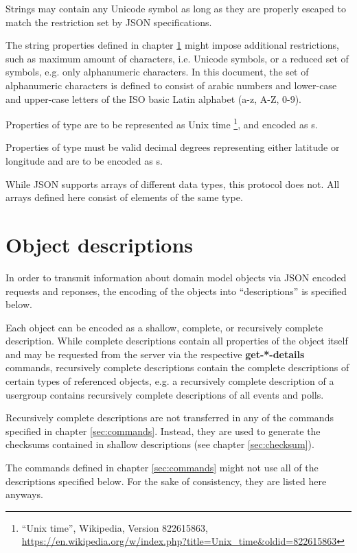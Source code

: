 \documentclass[parskip=full,11pt]{scrartcl}
\begin{document}
Strings may contain any Unicode symbol as long as they are properly escaped to
match the restriction set by JSON specifications.

The string properties defined in chapter \ref{sec:descriptions} might impose
additional restrictions, such as maximum amount of characters, i.e. Unicode
symbols, or a reduced set of symbols, e.g. only alphanumeric characters.
In this document, the set of alphanumeric characters is defined to consist
of arabic numbers and lower-case and upper-case letters of the ISO basic Latin
alphabet (a-z, A-Z, 0-9).

Properties of type  are to be represented as Unix time%
\footnote{\enquote{Unix time}, Wikipedia, Version 822615863,
\url{https://en.wikipedia.org/w/index.php?title=Unix_time&oldid=822615863}},
and encoded as s.

Properties of type  must be valid decimal degrees
representing either latitude or longitude and are to be encoded as
s.

While JSON supports arrays of different data types, this protocol does not.
All arrays defined here consist of elements of the same type.

\section{Object descriptions}\label{sec:descriptions}
In order to transmit information about domain model objects via JSON encoded
requests and reponses, the encoding of the objects into \enquote{descriptions}
is specified below.

Each object can be encoded as a shallow, complete, or recursively
complete description.
While complete descriptions contain all properties of the object itself and
may be requested from the server via the respective \textbf{get-*-details}
commands, recursively complete descriptions contain the complete descriptions
of certain types of referenced objects, e.g. a recursively complete description
of a usergroup contains recursively complete descriptions of all events and
polls.

Recursively complete descriptions are not transferred in any of the
commands specified in chapter \ref{sec:commands}.
Instead, they are used to generate the checksums contained in shallow
descriptions (see chapter \ref{sec:checksum}).

The commands defined in chapter \ref{sec:commands} might not use all of the
descriptions specified below.
For the sake of consistency, they are listed here anyways.
\end{document}
